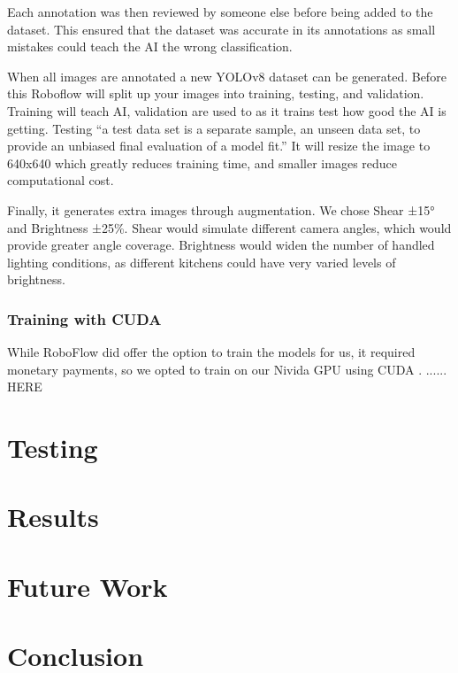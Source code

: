 \documentclass{article}
\begin{document}
Each annotation was then reviewed by someone else before being added to the dataset. This ensured that the dataset was accurate in its annotations as small mistakes could teach the AI the wrong classification.

When all images are annotated a new YOLOv8 dataset can be generated. Before this Roboflow will split up your images into training, testing, and validation. Training will teach AI, validation are used to as it trains test how good the AI is getting. Testing “a test data set is a separate sample, an unseen data set, to provide an unbiased final evaluation of a model fit.” \cite{trainvalidtest} It will resize the image to 640x640 which greatly reduces training time, and smaller images reduce computational cost. 

Finally, it generates extra images through augmentation. We chose Shear ±15° and Brightness ±25\%. Shear would simulate different camera angles, which would provide greater angle coverage. Brightness would widen the number of handled lighting conditions, as different kitchens could have very varied levels of brightness.

    \subsubsection{Training with CUDA}
    While RoboFlow did offer the option to train the models for us, it required monetary payments, so we opted to train on our Nivida GPU using CUDA \cite{cudacuda}.
    ...... HERE

    


    \section{Testing}

    \section{Results}

    \section{Future Work}

    \section{Conclusion}

    \pagebreak

    
  

  
  
  
\end{document}
